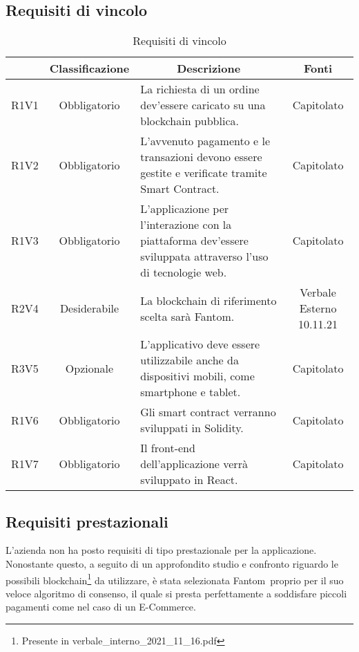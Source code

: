 \subsection{Requisiti di vincolo} \label{subsection:requisiti_vincolo}
\begin{table}[H]
    \centering
    \renewcommand{\arraystretch}{1.8}
    \begin{tabular}{c | c | p{6cm} | c}
        \rowcolor[HTML]{125E28}
        \multicolumn{1}{c}{\color[HTML]{FFFFFF} \textbf{Codice}} & 
		\multicolumn{1}{c}{\color[HTML]{FFFFFF} \textbf{Classificazione}} & 
		\multicolumn{1}{c}{\color[HTML]{FFFFFF} \textbf{Descrizione}} & 
		\multicolumn{1}{c}{\color[HTML]{FFFFFF} \textbf{Fonti}} \\
        \hline
		R1V1 & Obbligatorio & La richiesta di un ordine dev'essere caricato su una blockchain pubblica. & Capitolato \\
        R1V2 & Obbligatorio & L'avvenuto pagamento e le transazioni devono essere gestite e verificate tramite Smart Contract. & Capitolato \\
        R1V3 & Obbligatorio & L'applicazione per l'interazione con la piattaforma dev'essere sviluppata attraverso l'uso di tecnologie web. & Capitolato \\ 
        R2V4 & Desiderabile & La blockchain di riferimento scelta sarà Fantom. & Verbale Esterno 10.11.21 \\
        R3V5 & Opzionale & L'applicativo deve essere utilizzabile anche da dispositivi mobili, come smartphone e tablet. & Capitolato \\                       
        R1V6 & Obbligatorio & Gli smart contract verranno sviluppati in Solidity. & Capitolato \\
        R1V7 & Obbligatorio & Il front-end dell'applicazione verrà sviluppato in React. & Capitolato \\ 
    \end{tabular}
    \caption{Requisiti di vincolo}
\end{table}

\subsection{Requisiti prestazionali} \label{subsection:requisiti_prestazionali}

L'azienda non ha posto requisiti di tipo prestazionale per la applicazione.
Nonostante questo, a seguito di un approfondito studio e confronto riguardo le possibili blockchain\footnote{Presente in verbale\_interno\_2021\_11\_16.pdf} da utilizzare, è stata selezionata Fantom\glo\ proprio per il suo veloce algoritmo di consenso, il quale si presta perfettamente a soddisfare piccoli pagamenti 
come nel caso di un E-Commerce.

\clearpage
